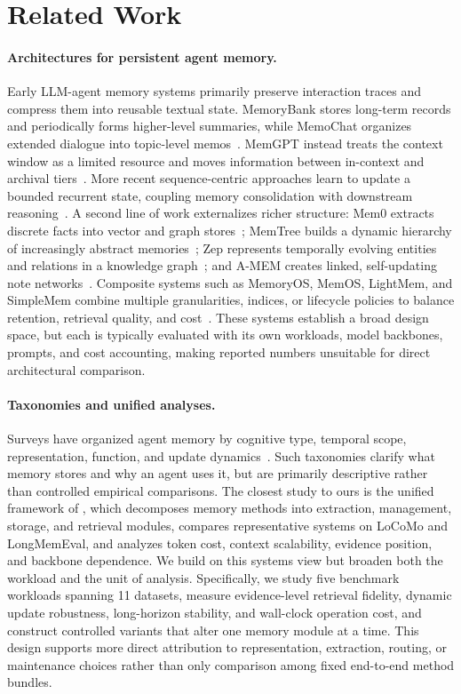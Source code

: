 \section{Related Work}
\label{sec:related_work}

\paragraph{Architectures for persistent agent memory.}
Early LLM-agent memory systems primarily preserve interaction traces and compress them into reusable textual state. MemoryBank stores long-term records and periodically forms higher-level summaries, while MemoChat organizes extended dialogue into topic-level memos~\citep{memorybank,Memochat}. MemGPT instead treats the context window as a limited resource and moves information between in-context and archival tiers~\citep{packer2023memgpt}. More recent sequence-centric approaches learn to update a bounded recurrent state, coupling memory consolidation with downstream reasoning~\citep{memagent,mem1}. A second line of work externalizes richer structure: Mem0 extracts discrete facts into vector and graph stores~\citep{chhikara2025mem0}; MemTree builds a dynamic hierarchy of increasingly abstract memories~\citep{MemTree}; Zep represents temporally evolving entities and relations in a knowledge graph~\citep{rasmussen2025zep}; and A-MEM creates linked, self-updating note networks~\citep{xu2025amem}. Composite systems such as MemoryOS, MemOS, LightMem, and SimpleMem combine multiple granularities, indices, or lifecycle policies to balance retention, retrieval quality, and cost~\citep{memoryos,MemOS,LightMem,simplemem}. These systems establish a broad design space, but each is typically evaluated with its own workloads, model backbones, prompts, and cost accounting, making reported numbers unsuitable for direct architectural comparison.

\paragraph{Taxonomies and unified analyses.}
Surveys have organized agent memory by cognitive type, temporal scope, representation, function, and update dynamics~\citep{zhang2024survey,hu2025memory}. Such taxonomies clarify what memory stores and why an agent uses it, but are primarily descriptive rather than controlled empirical comparisons. The closest study to ours is the unified framework of \citet{wu2026memoryeab}, which decomposes memory methods into extraction, management, storage, and retrieval modules, compares representative systems on LoCoMo and LongMemEval, and analyzes token cost, context scalability, evidence position, and backbone dependence. We build on this systems view but broaden both the workload and the unit of analysis. Specifically, we study five benchmark workloads spanning 11 datasets, measure evidence-level retrieval fidelity, dynamic update robustness, long-horizon stability, and wall-clock operation cost, and construct controlled variants that alter one memory module at a time. This design supports more direct attribution to representation, extraction, routing, or maintenance choices rather than only comparison among fixed end-to-end method bundles.

